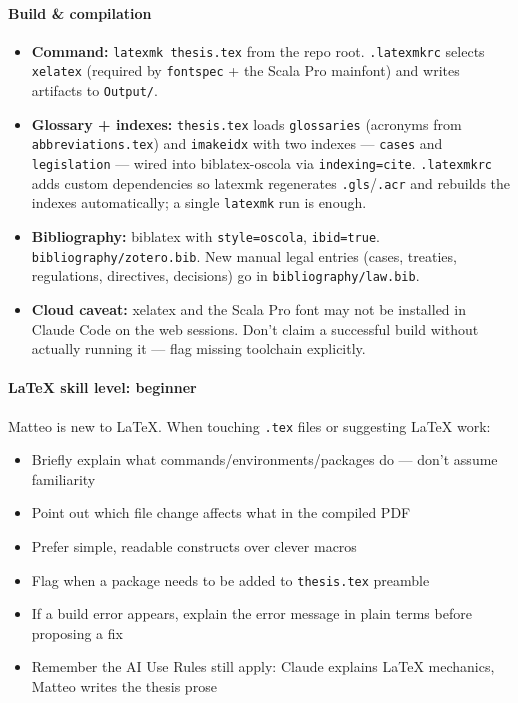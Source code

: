 \paragraph{Build \& compilation}
\begin{itemize}
  \item \textbf{Command:} \texttt{latexmk thesis.tex} from the repo root.
        \texttt{.latexmkrc} selects \texttt{xelatex} (required by \texttt{fontspec}
        + the Scala Pro mainfont) and writes artifacts to \texttt{Output/}.
  \item \textbf{Glossary + indexes:} \texttt{thesis.tex} loads \texttt{glossaries}
        (acronyms from \texttt{abbreviations.tex}) and \texttt{imakeidx} with two
        indexes --- \texttt{cases} and \texttt{legislation} --- wired into
        biblatex-oscola via \texttt{indexing=cite}. \texttt{.latexmkrc} adds custom
        dependencies so latexmk regenerates \texttt{.gls}/\texttt{.acr} and rebuilds
        the indexes automatically; a single \texttt{latexmk} run is enough.
  \item \textbf{Bibliography:} biblatex with \texttt{style=oscola},
        \texttt{ibid=true}. \texttt{bibliography/zotero.bib}. New manual legal
        entries (cases, treaties, regulations, directives, decisions) go in
        \texttt{bibliography/law.bib}.
  \item \textbf{Cloud caveat:} xelatex and the Scala Pro font may not be installed
        in Claude Code on the web sessions. Don't claim a successful build without
        actually running it --- flag missing toolchain explicitly.
\end{itemize}

\paragraph{LaTeX skill level: beginner}
Matteo is new to LaTeX. When touching \texttt{.tex} files or suggesting LaTeX work:
\begin{itemize}
  \item Briefly explain what commands/environments/packages do --- don't assume
        familiarity
  \item Point out which file change affects what in the compiled PDF
  \item Prefer simple, readable constructs over clever macros
  \item Flag when a package needs to be added to \texttt{thesis.tex} preamble
  \item If a build error appears, explain the error message in plain terms before
        proposing a fix
  \item Remember the AI Use Rules still apply: Claude explains LaTeX mechanics,
        Matteo writes the thesis prose
\end{itemize}

